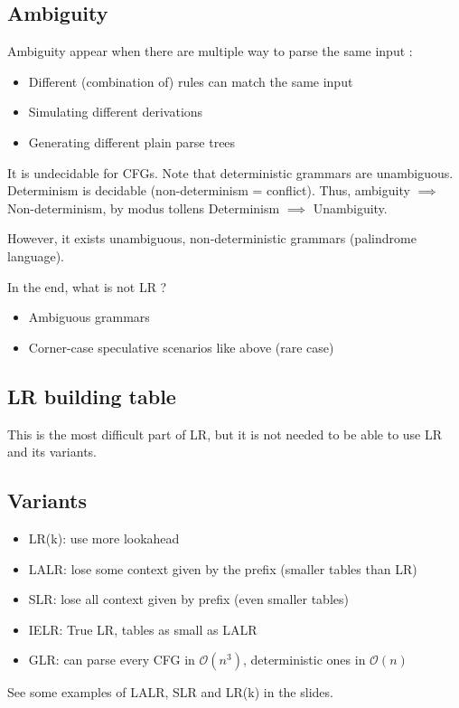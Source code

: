     \subsection{Ambiguity}
        \theoremstyle{definition}
        \begin{definition}[Ambiguity]
            Ambiguity appear when there are multiple way to parse the same input : 
            \begin{itemize}
                \item Different (combination of) rules can match the same input
                \item Simulating different derivations
                \item Generating different plain parse trees
            \end{itemize}
        \end{definition}

        It is undecidable for CFGs. Note that deterministic grammars are
        unambiguous. Determinism is decidable (non-determinism = conflict).
        Thus, ambiguity $\implies$ Non-determinism, by modus tollens
        Determinism $\implies$ Unambiguity.

        However, it exists unambiguous, non-deterministic grammars (palindrome
        language).

        In the end, what is not LR ? 
        \begin{itemize}
            \item Ambiguous grammars
            \item Corner-case speculative scenarios like above (rare case)
        \end{itemize}
    \subsection{LR building table}
        This is the most difficult part of LR, but it is not needed to be able
        to use LR and its variants.
    \subsection{Variants}
        \begin{itemize}
            \item LR(k): use more lookahead
            \item LALR: lose some context given by the prefix (smaller tables than LR)
            \item SLR: lose all context given by prefix (even smaller tables)
            \item IELR: True LR, tables as small as LALR
            \item GLR: can parse every CFG in $\mathcal{O}(n^3)$, deterministic
            ones in $\mathcal{O}(n)$
        \end{itemize}
        See some examples of LALR, SLR and LR(k) in the slides.
